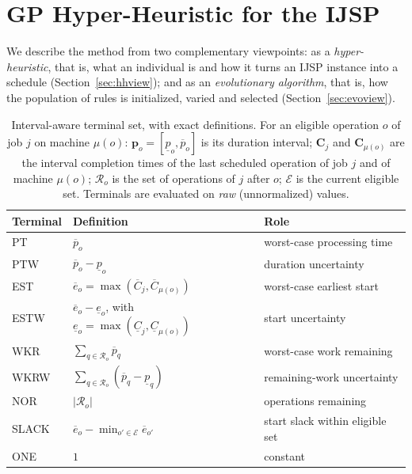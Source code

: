 \documentclass[review,authoryear,11pt]{elsarticle}
\begin{document}
\section{GP Hyper-Heuristic for the IJSP}
\label{sec:method}

We describe the method from two complementary viewpoints: as a
\emph{hyper-heuristic}, that is, what an individual is and how it turns
an IJSP instance into a schedule (Section~\ref{sec:hhview}); and as an
\emph{evolutionary algorithm}, that is, how the population of rules is
initialized, varied and selected (Section~\ref{sec:evoview}).

\begin{table}[!t]
\centering\small
\caption{Interval-aware terminal set, with exact definitions. For an
eligible operation $o$ of job $j$ on machine $\mu(o)$: $\mathbf{p}_o =
[\underline{p}_o, \overline{p}_o]$ is its duration interval; $\mathbf{C}_j$ and
$\mathbf{C}_{\mu(o)}$ are the interval completion times of the last
scheduled operation of job $j$ and of machine $\mu(o)$; $\mathcal{R}_o$ is the set of operations of
$j$ after $o$; $\mathcal{E}$ is the current eligible set. Terminals are
evaluated on \emph{raw} (unnormalized) values.}
\label{tab:terminals}
\begin{tabular}{lll}
\toprule
Terminal & Definition & Role \\
\midrule
PT   & $\overline{p}_o$ & worst-case processing time \\
PTW  & $\overline{p}_o-\underline{p}_o$ & duration uncertainty \\
EST  & $\overline{e}_o = \max(\overline{C}_j, \overline{C}_{\mu(o)})$ &
worst-case earliest start \\
ESTW & $\overline{e}_o - \underline{e}_o$, with
$\underline{e}_o=\max(\underline{C}_j,\underline{C}_{\mu(o)})$ &
start uncertainty \\
WKR  & $\sum_{q\in\mathcal{R}_o}\overline{p}_q$ & worst-case work
remaining \\
WKRW & $\sum_{q\in\mathcal{R}_o}(\overline{p}_q-\underline{p}_q)$ &
remaining-work uncertainty \\
NOR  & $|\mathcal{R}_o|$ & operations remaining \\
SLACK& $\overline{e}_o - \min_{o'\in\mathcal{E}}\overline{e}_{o'}$ &
start slack within eligible set \\
ONE  & $1$ & constant \\
\bottomrule
\end{tabular}
\end{table}
\end{document}
